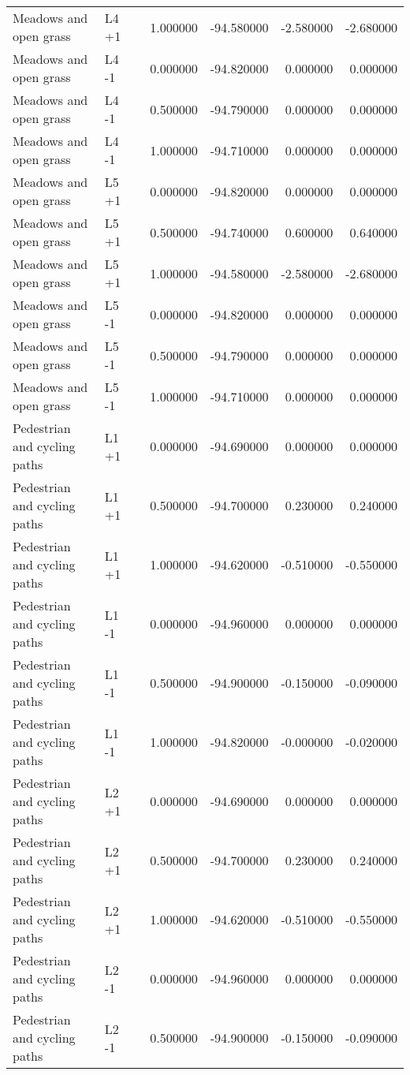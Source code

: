 \begin{tabular}{lllrrrr}
Meadows and open grass & L4 +1 &  & 1.000000 & -94.580000 & -2.580000 & -2.680000 \\
Meadows and open grass & L4 -1 &  & 0.000000 & -94.820000 & 0.000000 & 0.000000 \\
Meadows and open grass & L4 -1 &  & 0.500000 & -94.790000 & 0.000000 & 0.000000 \\
Meadows and open grass & L4 -1 &  & 1.000000 & -94.710000 & 0.000000 & 0.000000 \\
Meadows and open grass & L5 +1 &  & 0.000000 & -94.820000 & 0.000000 & 0.000000 \\
Meadows and open grass & L5 +1 &  & 0.500000 & -94.740000 & 0.600000 & 0.640000 \\
Meadows and open grass & L5 +1 &  & 1.000000 & -94.580000 & -2.580000 & -2.680000 \\
Meadows and open grass & L5 -1 &  & 0.000000 & -94.820000 & 0.000000 & 0.000000 \\
Meadows and open grass & L5 -1 &  & 0.500000 & -94.790000 & 0.000000 & 0.000000 \\
Meadows and open grass & L5 -1 &  & 1.000000 & -94.710000 & 0.000000 & 0.000000 \\
Pedestrian and cycling paths & L1 +1 &  & 0.000000 & -94.690000 & 0.000000 & 0.000000 \\
Pedestrian and cycling paths & L1 +1 &  & 0.500000 & -94.700000 & 0.230000 & 0.240000 \\
Pedestrian and cycling paths & L1 +1 &  & 1.000000 & -94.620000 & -0.510000 & -0.550000 \\
Pedestrian and cycling paths & L1 -1 &  & 0.000000 & -94.960000 & 0.000000 & 0.000000 \\
Pedestrian and cycling paths & L1 -1 &  & 0.500000 & -94.900000 & -0.150000 & -0.090000 \\
Pedestrian and cycling paths & L1 -1 &  & 1.000000 & -94.820000 & -0.000000 & -0.020000 \\
Pedestrian and cycling paths & L2 +1 &  & 0.000000 & -94.690000 & 0.000000 & 0.000000 \\
Pedestrian and cycling paths & L2 +1 &  & 0.500000 & -94.700000 & 0.230000 & 0.240000 \\
Pedestrian and cycling paths & L2 +1 &  & 1.000000 & -94.620000 & -0.510000 & -0.550000 \\
Pedestrian and cycling paths & L2 -1 &  & 0.000000 & -94.960000 & 0.000000 & 0.000000 \\
Pedestrian and cycling paths & L2 -1 &  & 0.500000 & -94.900000 & -0.150000 & -0.090000 \\

\end{tabular}
